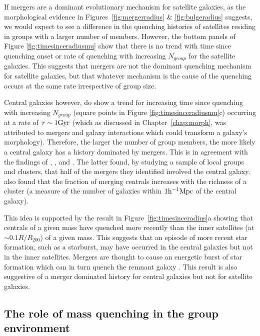 If mergers are a dominant evolutionary mechanism for satellite galaxies, as the morphological evidence in Figures~\ref{fig:mergerradius} \& \ref{fig:bulgeradius} suggests, we would expect to see a difference in the quenching histories of satellites residing in groups with a larger number of members. However, the bottom panels of Figure \ref{fig:timesinceradiusmu} show that there is no trend with time since quenching onset or rate of quenching with increasing $N_{group}$ for the satellite galaxies. This suggests that mergers are not the dominant quenching mechanism for satellite galaxies, but that whatever mechanism is the cause of the quenching occurs at the same rate irrespective of group size. 

Central galaxies however, do show a trend for increasing time since quenching with increasing $N_{group}$ (square points in Figure \ref{fig:timesinceradiusmu}c) occurring at a rate of $\tau \sim 1 \rm{Gyr}$ (which as discussed in Chapter~\ref{chap:morph}, was attributed to mergers and galaxy interactions which could transform a galaxy's morphology). Therefore, the larger the number of group members, the more likely a central galaxy has a history dominated by mergers. This is in agreement with the findings of \citet{lin10}, \citet{ellison10}, \citet{lidman13} and \citet{mcintosh08}. The latter found, by studying a sample of local groups and clusters, that half of the mergers they identified involved the central galaxy. \cite{liu09} also found that the fraction of merging centrals increases with the richness of a cluster (a measure of the number of galaxies within $1\rm{h}^{-1}\rm{Mpc}$ of the central galaxy).

This idea is supported by the result in Figure~\ref{fig:timesinceradius}a showing that centrals of a given mass have quenched more recently than the inner satellites (at $\sim0.1R/R_{200}$) of a given mass. This suggests that an episode of more recent star formation, such as a starburst, may have occurred in the central galaxies but not in the inner satellites. Mergers are thought to cause an energetic burst of star formation which can in turn quench the remnant galaxy \citep[][as discussed in Section \ref{rapid}]{hopkins05, treister12, pontzen16}. This result is also suggestive of a merger dominated history for central galaxies but not for satellite galaxies.

\subsection{The role of mass quenching in the group environment}\label{sec:rolemassenv}

